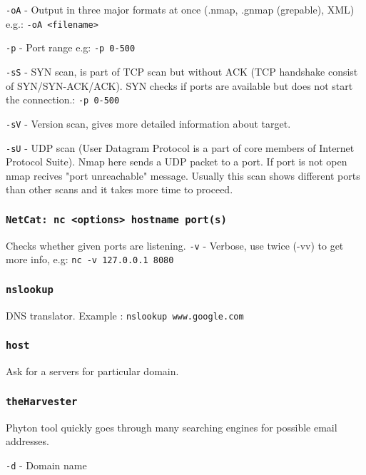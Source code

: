 \documentclass{article}[12pt]
\begin{document}
\texttt{-oA} - Output in three major formats at once (.nmap, .gnmap (grepable), XML) e.g.: \texttt{-oA <filename>}
\newline

\texttt{-p} - Port range e.g: \texttt{-p 0-500}
\newline

\texttt{-sS} - SYN scan, is part of TCP scan but without ACK (TCP handshake consist of SYN/SYN-ACK/ACK).
SYN checks if ports are available but does not start the connection.: \texttt{-p 0-500}
\newline

\texttt{-sV} - Version scan, gives more detailed information about target.
\newline

\texttt{-sU} - UDP scan (User Datagram Protocol is a part of core members of Internet Protocol Suite). Nmap here
sends a UDP packet to a port. If port is not open nmap recives "port unreachable" message. Usually this scan shows
different ports than other scans and it takes more time to proceed.
\newline



\subsubsection*{\texttt{NetCat: nc <options> hostname port(s)}}
Checks whether given ports are listening.
\texttt{-v} - Verbose, use twice (-vv) to get more info, e.g: \texttt{nc -v 127.0.0.1  8080}

\subsubsection*{\texttt{nslookup}}
DNS translator. Example : \texttt{nslookup www.google.com}
\subsubsection*{\texttt{host}}
Ask for a servers for particular domain.

\subsubsection*{\texttt{theHarvester}}
Phyton tool quickly goes through many searching engines for possible email addresses.
\newline

\texttt{-d} - Domain name
\newline
\end{document}
